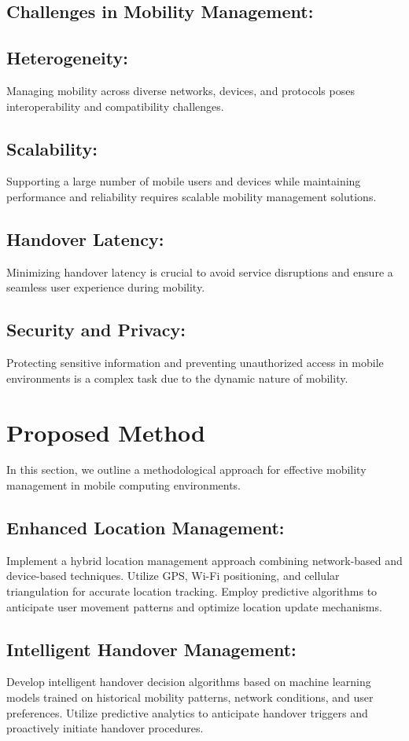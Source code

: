 \documentclass[12pt]{report}
\begin{document}
\subsection*{Challenges in Mobility Management:}
\subsection*{Heterogeneity:}  Managing mobility across diverse networks, devices, and protocols poses interoperability and compatibility challenges.
\subsection*{Scalability:} Supporting a large number of mobile users and devices while maintaining performance and reliability requires scalable mobility management solutions.
\subsection*{Handover Latency:} Minimizing handover\cite{handover} latency is crucial to avoid service disruptions and ensure a seamless user experience during mobility.
\subsection*{Security and Privacy:}  Protecting sensitive information and preventing unauthorized access in mobile environments is a complex task due to the dynamic nature of mobility.




\newpage
\section*{Proposed Method}
In this section, we outline a methodological approach for effective mobility management in mobile computing environments.
\subsection*{Enhanced Location Management:}  Implement a hybrid location\cite{location} management approach combining network-based and device-based techniques. Utilize GPS, Wi-Fi positioning, and cellular triangulation for accurate location tracking. Employ predictive algorithms to anticipate user movement patterns and optimize location update mechanisms.
\subsection*{Intelligent Handover Management:}   Develop intelligent handover\cite{mobility} decision algorithms based on machine learning models trained on historical mobility patterns, network conditions, and user preferences. Utilize predictive analytics to anticipate handover triggers and proactively initiate handover procedures.
\end{document}
